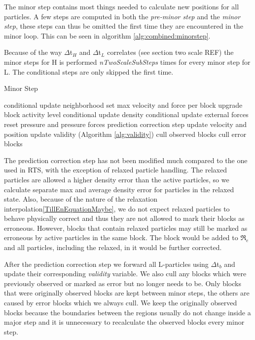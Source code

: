 \documentclass[../../main.tex]{subfiles}
\begin{document}

The minor step contains most things needed to calculate new positions for all particles. A few steps are computed in both the \textit{pre-minor step} and the \textit{minor step}, these steps can thus be omitted the first time they are encountered in the minor loop. This can be seen in algorithm \ref{alg:combined:minorstep}. 

Because of the way $\Delta$t$_H$ and $\Delta$t$_L$ correlates (see section two scale REF) the minor steps for H is performed \textit{nTwoScaleSubSteps} times for every minor step for L. The conditional steps are only skipped the first time. 

\begin{algorithm}[h]
    \caption{Minor Step}
    \label{alg:combined:minorstep}
    \begin{algorithmic}[1]
        \State conditional update neighborhood 
        \State set max velocity and force per block
        \State upgrade block activity level
        \State conditional update density 
        \State conditional update external forces
    \EndIf
    \State reset pressure and pressure forces
    \State prediction correction step
    \State update velocity and position
    \State update validity (Algorithm \ref{alg:validity})
    \State cull observed blocks
	\State cull error blocks
   \end{algorithmic}
\end{algorithm}

The prediction correction step has not been modified much compared to the one used in RTS, with the exception of relaxed particle handling. The relaxed particles are allowed a higher density error than the active particles, so we calculate separate max and average density error for particles in the relaxed state. Also, because of the nature of the relaxation interpolation\ref{TillEnEquationMaybe}, we do not expect relaxed particles to behave physically correct and thus they are not allowed to mark their blocks as erroneous. However, blocks that contain relaxed particles may still be marked as erroneous by active particles in the same block. The block would be added to $\Re_e$ and all particles, including the relaxed, in it would be further corrected.

After the prediction correction step we forward all L-particles using $\Delta$t$_b$ and update their corresponding \textit{validity} variable. We also cull any blocks which were previously observed or marked as error but no longer needs to be. Only blocks that were originally observed blocks are kept between minor steps, the others are caused by error blocks which we always cull. We keep the originally observed blocks because the boundaries between the regions usually do not change inside a major step and it is unnecessary to recalculate the observed blocks every minor step. 
\end{document}
